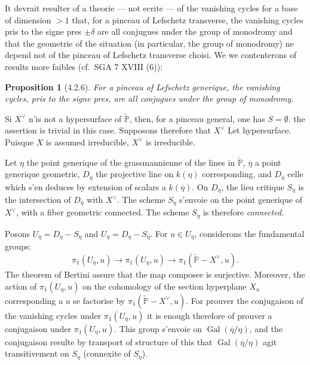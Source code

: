 \documentclass[12pt,a4paper]{article}
\theoremstyle{plain}
\newtheorem{proposition}[theorem]{Proposition}
\theoremstyle{definition}
\theoremstyle{remark}
\DeclareMathOperator{\Gal}{Gal}
\newcommand{\bbP}{\mathbb{P}}
\begin{document}
It devrait resulter of a theorie --- not ecrite --- of the vanishing cycles for a base of dimension $> 1$ that, for a pinceau of Lefschetz transverse, the vanishing cycles pris to the signe pres $\pm \delta$ are all conjugues under the group of monodromy and that the geometrie of the situation (in particular, the group of monodromy) ne depend not of the pinceau of Lefschetz transverse choisi. We we contenterons of results more faibles (cf.~SGA 7 XVIII (6)):

\begin{proposition}[4.2.6]
For a pinceau of Lefschetz generique, the vanishing cycles, pris to the signe pres, are all conjugues under the group of monodromy.
\end{proposition}

Si $X^\vee$ n'is not a hypersurface of $\check{\bbP}$, then, for a pinceau general, one has $S = \emptyset$. the assertion is trivial in this case. Supposons therefore that $X^\vee$ Let hypersurface. Puisque $X$ is assumed irreducible, $X^\vee$ is irreducible.

Let $\eta$ the point generique of the grassmannienne of the lines in $\check{\bbP}$, $\overline{\eta}$ a point generique geometric, $D_\eta$ the projective line on $k(\eta)$ corresponding, and $D_{\overline{\eta}}$ celle which s'en deduces by extension of scalars a $k(\overline{\eta})$. On $D_{\overline{\eta}}$, the lieu critique $S_{\overline{\eta}}$ is the intersection of $D_{\overline{\eta}}$ with $X^\vee$. The scheme $S_\eta$ s'envoie on the point generique of $X^\vee$, with a fiber geometric connected. The scheme $S_\eta$ is therefore \emph{connected}.

Posons $U_\eta = D_\eta - S_\eta$ and $U_{\overline{\eta}} = D_{\overline{\eta}} - S_{\overline{\eta}}$. For $u \in U_{\overline{\eta}}$, considerons the fundamental groups:
\[
\pi_1(U_{\overline{\eta}}, u) \to \pi_1(U_\eta, u) \to \pi_1(\check{\bbP} - X^\vee, u).
\]
The theorem of Bertini assure that the map composee is surjective. Moreover, the action of $\pi_1(U_\eta, u)$ on the cohomology of the section hyperplane $X_u$ corresponding a $u$ se factorise by $\pi_1(\check{\bbP} - X^\vee, u)$. For prouver the conjugaison of the vanishing cycles under $\pi_1(U_{\overline{\eta}}, u)$ it is enough therefore of prouver a conjugaison under $\pi_1(U_\eta, u)$. This group s'envoie on $\Gal(\overline{\eta}/\eta)$, and the conjugaison resulte by transport of structure of this that $\Gal(\overline{\eta}/\eta)$ agit transitivement on $S_{\overline{\eta}}$ (connexite of $S_\eta$).
\end{document}
